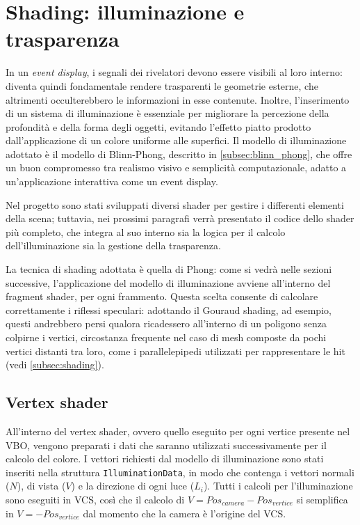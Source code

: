 \section{Shading: illuminazione e trasparenza}
In un \emph{event display}, i segnali dei rivelatori devono essere visibili al loro interno: diventa quindi fondamentale rendere trasparenti le geometrie esterne, che altrimenti occulterebbero le informazioni in esse contenute.
Inoltre, l'inserimento di un sistema di illuminazione è essenziale per migliorare la percezione della profondità e della forma degli oggetti, evitando l'effetto piatto prodotto dall'applicazione di un colore uniforme alle superfici.
Il modello di illuminazione adottato è il modello di Blinn-Phong, descritto in \cref{subsec:blinn_phong}, che offre un buon compromesso tra realismo visivo e semplicità computazionale, adatto a un'applicazione interattiva come un event display.

Nel progetto sono stati sviluppati diversi shader per gestire i differenti elementi della scena; tuttavia, nei prossimi paragrafi verrà presentato il codice dello shader più completo, che integra al suo interno sia la logica per il calcolo dell'illuminazione sia la gestione della trasparenza.

La tecnica di shading adottata è quella di Phong: come si vedrà nelle sezioni successive, l'applicazione del modello di illuminazione avviene all'interno del fragment shader, per ogni frammento.
Questa scelta consente di calcolare correttamente i riflessi speculari: adottando il Gouraud shading, ad esempio, questi andrebbero persi qualora ricadessero all'interno di un poligono senza colpirne i vertici, circostanza frequente nel caso di mesh composte da pochi vertici distanti tra loro, come i parallelepipedi utilizzati per rappresentare le hit (vedi \cref{subsec:shading}).

\subsection{Vertex shader}
All'interno del vertex shader, ovvero quello eseguito per ogni vertice presente nel VBO, vengono preparati i dati che saranno utilizzati successivamente per il calcolo del colore.
I vettori richiesti dal modello di illuminazione sono stati inseriti nella struttura \texttt{IlluminationData}, in modo che contenga i vettori normali ($N$), di vista ($V$) e la direzione di ogni luce ($L_i$).
Tutti i calcoli per l'illuminazione sono eseguiti in VCS, così che il calcolo di $V = {Pos}_{camera} - {Pos}_{vertice}$ si semplifica in $V = -{Pos}_{vertice}$ dal momento che la camera è l'origine del VCS.\@

